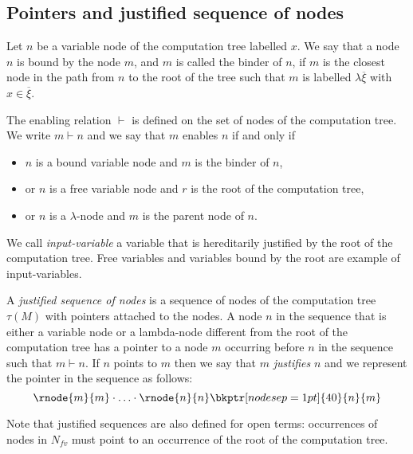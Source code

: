 \subsection{Pointers and justified sequence of nodes}

\begin{dfn}[Binder]
Let $n$ be a variable node of the computation tree labelled $x$. We
say that a node $n$ is bound by the node $m$, and $m$ is called the
binder of $n$, if $m$ is the closest node in the path from $n$ to
the root of the tree such that $m$ is labelled $\lambda
\overline{\xi}$ with $x\in \overline{\xi}$.
\end{dfn}

\begin{dfn}[Enabling]
The enabling relation $\vdash$ is defined on the set of nodes of the
computation tree. We write $m \vdash n$ and we say that $m$ enables
$n$ if and only if
\begin{itemize}
\item $n$ is a bound variable node and $m$ is the binder of $n$,
\item or $n$ is a free variable node and $r$ is the root of the computation tree,
\item or $n$ is a $\lambda$-node and $m$ is the parent node of $n$.
\end{itemize}
\end{dfn}

We call \emph{input-variable} a variable that is hereditarily justified by the root of the computation tree.
Free variables and variables bound by the root are example of input-variables.

\begin{dfn}
A \emph{justified sequence of nodes} is a sequence of
nodes of the computation tree $\tau(M)$ with pointers attached to the nodes. A node $n$ in the sequence
that is either a variable node or a lambda-node different from the root of the computation tree
has a pointer to a node $m$ occurring before $n$ in the sequence such that $m \vdash n$.
If $n$ points to $m$ then we say that $m$ \emph{justifies} $n$ and we represent the pointer in the sequence as follows:
$$\rnode{m}{m} \cdot \ldots \cdot \rnode{n}{n} \bkptr[nodesep=1pt]{40}{n}{m}$$
\end{dfn}
Note that justified sequences are also defined for open terms:
occurrences of nodes in $N_{fv}$ must point to an occurrence of the
root of the computation tree.



